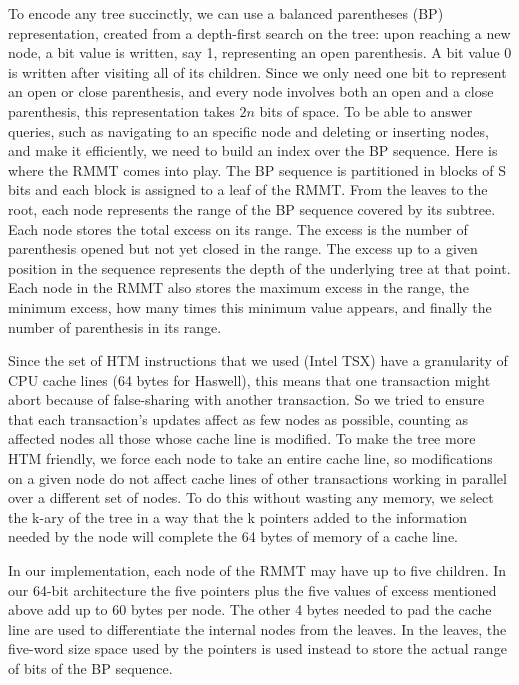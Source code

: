 \documentclass{llncs}
\begin{document}
To encode any tree succinctly, we can use a balanced parentheses (BP) representation, created from a depth-first search on the tree: upon reaching a new node, a bit value is written, say 1, representing an open parenthesis. A bit value 0 is written after visiting all of its children. Since we only need one bit to represent an open or close parenthesis, and every node involves both an open and a close parenthesis, this representation takes $2n$ bits of space. To be able to answer queries, such as navigating to an specific node and deleting or inserting nodes, and make it efficiently, we need to build an index over the BP sequence. Here is where the RMMT comes into play. The BP sequence is partitioned in blocks of S bits and each block is assigned to a leaf of the RMMT. From the leaves to the root, each node represents the range of the BP sequence covered by its subtree. Each node stores the total excess on its range. The excess is the number of parenthesis opened but not yet closed in the range. The excess up to a given position in the sequence represents the depth of the underlying tree at that point. Each node in the RMMT also stores the maximum excess in the range, the minimum excess, how many times this minimum value appears, and finally the number of parenthesis in its range. 

Since the set of HTM instructions that we used (Intel TSX) have a granularity of CPU cache lines (64 bytes for Haswell), this means that one transaction might abort because of false-sharing with another transaction. So we tried to ensure that each transaction's updates affect as few nodes as possible, counting as affected nodes all those whose cache line is modified. To make the tree more HTM friendly, we force each node to take an entire cache line, so modifications on a given node do not affect cache lines of other transactions working in parallel over a different set of nodes. To do this without wasting any memory, we select the k-ary of the tree in a way that the k pointers added to the information needed by the node will complete the 64 bytes of memory of a cache line.

In our implementation, each node of the RMMT may have up to five children. In our 64-bit architecture the five pointers plus the five values of excess mentioned above add up to 60 bytes per node. The other 4 bytes needed to pad the cache line are used to differentiate the internal nodes from the leaves. In the leaves, the five-word size space used by the pointers is used instead to store the actual range of bits of the BP sequence.
\end{document}

